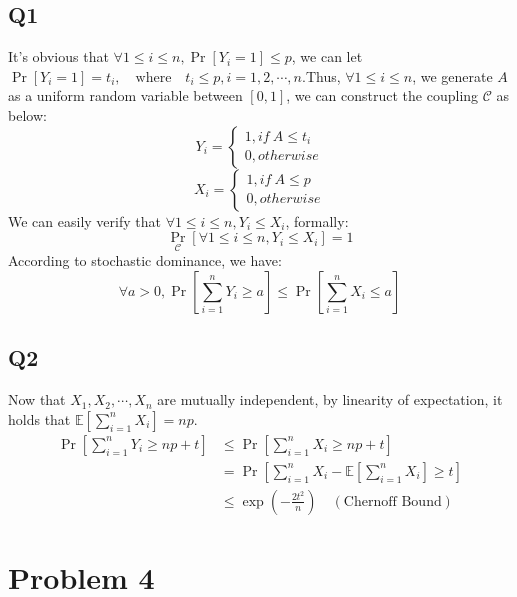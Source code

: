 \documentclass[a4paper, 12pt, titlepage]{article}
\begin{document}
\subsection{Q1}
It's obvious that $\forall 1 \leq i \leq n, \Pr \left[ Y_{i} = 1 \right] \leq p $, we can let $\Pr \left[ Y_{i} = 1 \right] = t_{i}, \quad \text{where} \quad t_{i} \leq p, i = 1, 2, \cdots, n$.Thus, $\forall 1 \leq i \leq n$, we generate $A$ as a uniform random variable between $\left[ 0, 1 \right]$, we can construct the
coupling $\mathcal{C}$ as below:
\[
    Y_{i} = \begin{cases}
        1, if \ A \leq t_{i} \\
        0, otherwise
    \end{cases}  
\]
\[
    X_{i} = \begin{cases}
        1, if \ A \leq p \\
        0, otherwise
    \end{cases}  
\]
We can easily verify that $\forall 1 \leq i \leq n, Y_{i} \leq X_{i}$, formally:
\[
    \Pr_{\mathcal{C}} \left[ \forall 1 \leq i \leq n, Y_{i} \leq X_{i} \right] = 1
\]
According to stochastic dominance, we have:
\[
    \forall a > 0, \Pr \left[ \sum_{i = 1}^{n} Y_{i} \geq a \right] \leq \Pr \left[ \sum_{i = 1}^{n} X_{i} \leq a \right] 
\]

\subsection{Q2}
Now that $X_{1}, X_{2}, \cdots, X_{n}$ are mutually independent, by linearity of expectation, it holds that $\mathbb E \left[ \sum_{i = 1}^{n} X_{i} \right] = np$.
\begin{equation}
    \begin{aligned}
        \Pr \left[ \sum_{i = 1}^{n} Y_{i} \geq np + t \right] &\leq  \Pr \left[ \sum_{i = 1}^{n} X_{i} \geq np + t \right] \\
                                                              &= \Pr \left[ \sum_{i = 1}^{n} X_{i} - \mathbb E \left[ \sum_{i = 1}^{n} X_{i} \right] \geq t \right] \\
                                                              &\leq \exp \left( - \frac{2 t^2}{n} \right) \quad (\text{Chernoff Bound})
    \end{aligned}
\end{equation}

\section{Problem 4}
\end{document}
